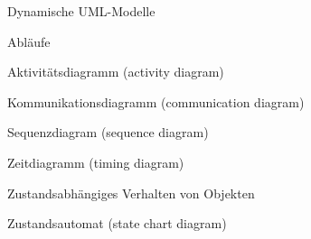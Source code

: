 \documentclass[a4paper]{article}
\begin{document}
\begin{multicols}{3}
  Dynamische UML-Modelle
  \begin{itemize*}
    \item Abläufe
          \begin{itemize*}
            \item Aktivitätsdiagramm (activity diagram)
            \item Kommunikationsdiagramm (communication diagram)
            \item Sequenzdiagram (sequence diagram)
            \item Zeitdiagramm (timing diagram)
          \end{itemize*}
    \item Zustandsabhängiges Verhalten von Objekten
          \begin{itemize*}
            \item Zustandsautomat (state chart diagram)
          \end{itemize*}
  \end{itemize*}


\end{multicols}
\end{document}
